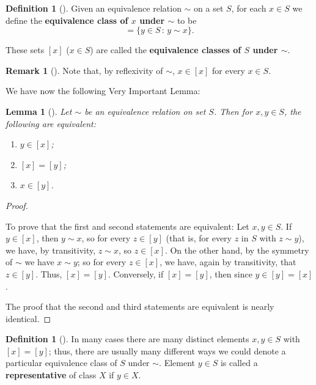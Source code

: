 \documentclass[10pt,]{book}
\newcommand{\terminology}[1]{\textbf{#1}}
\theoremstyle{plain}
\newtheorem{lemma}[theorem]{Lemma}
\theoremstyle{definition}
\newtheorem{definition}[theorem]{Definition}
\theoremstyle{definition}
\newtheorem{remark}[theorem]{Remark}
\theoremstyle{definition}
\theoremstyle{definition}
\numberwithin{equation}{section}
\begin{document}
\begin{definition}[{}]\label{definition-57}
Given an equivalence relation \(\sim\) on a set \(S\), for each \(x\in S\) we define the \terminology{equivalence class of \(x\) under \(\sim\)} to be%
\begin{equation*}
[x]=\{y\in S\,:\, y\sim x\}.
\end{equation*}
%
\par
These sets \([x]\) (\(x\in S\)) are called the \terminology{equivalence classes of \(S\) under \(\sim\)}.%
\end{definition}
\begin{remark}[]\label{remark-34}
Note that, by reflexivity of \(\sim\), \(x\in [x]\) for every \(x\in S\).%
\end{remark}
We have now the following Very Important Lemma:%
\begin{lemma}[{}]\label{vil_lem}
Let \(\sim\) be an equivalence relation on set \(S\). Then for \(x,y\in S\), the following are equivalent: \leavevmode%
\begin{enumerate}
\item\hypertarget{li-391}{}\(y\in [x]\);%
\item\hypertarget{li-392}{}\([x]=[y]\);%
\item\hypertarget{li-393}{}\(x\in [y]\).%
\end{enumerate}
%
%
\end{lemma}
\begin{proof}\hypertarget{proof-35}{}
To prove that the first and second statements are equivalent: Let \(x, y\in S\). If \(y\in
[x]\), then \(y \sim x\), so for every \(z\in [y]\) (that is, for every \(z\) in \(S\) with \(z\sim y\)), we have, by transitivity, \(z\sim x\), so \(z\in [x]\). On the other hand, by the symmetry of \(\sim\) we have \(x\sim y\); so for every \(z\in [x]\), we have, again by transitivity, that \(z\in [y]\). Thus, \([x]=[y]\). Conversely, if \([x]=[y]\), then since \(y\in [y]=[x]\).%
\par
The proof that the second and third statements are equivalent is nearly identical.%
\end{proof}
\begin{definition}[{}]\label{definition-58}
In many cases there are many distinct elements \(x,y\in S\) with \([x]=[y]\); thus, there are usually many different ways we could denote a particular equivalence class of \(S\) under \(\sim\). Element \(y\in S\) is called a \terminology{representative} of class \(X\) if \(y\in X\).%
\end{definition}
\end{document}
